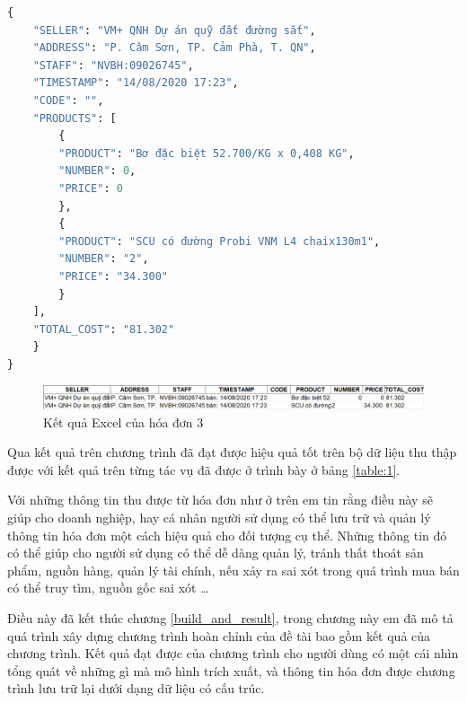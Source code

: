 \begin{lstlisting}[language=Python]
{
    "SELLER": "VM+ QNH Dự án quỹ đất đường sắt",
    "ADDRESS": "P. Câm Sơn, TP. Cảm Phà, T. QN",
    "STAFF": "NVBH:09026745",
    "TIMESTAMP": "14/08/2020 17:23",
    "CODE": "",
    "PRODUCTS": [
        {
        "PRODUCT": "Bơ đặc biệt 52.700/KG x 0,408 KG",
        "NUMBER": 0,
        "PRICE": 0
        },
        {
        "PRODUCT": "SCU có đường Probi VNM L4 chaix130m1",
        "NUMBER": "2",
        "PRICE": "34.300"
        }
    ],
    "TOTAL_COST": "81.302"
    }
}
\end{lstlisting}

\begin{figure}[h]
    \includegraphics[scale=0.314]{images/result-demo-excel-3.png}
    \caption{Kết quả Excel của hóa đơn 3}
\end{figure}
Qua kết quả trên chương trình đã đạt được hiệu quả tốt trên bộ dữ liệu thu thập được với kết quả trên từng tác vụ đã được ở trình bày ở bảng \ref{table:1}. 

Với những thông tin thu được từ hóa đơn như ở trên em tin rằng điều này sẽ giúp cho doanh nghiệp, hay cá nhân người sử dụng có thể lưu trữ và quản lý thông tin hóa đơn một cách hiệu quả cho đối tượng cụ thể. Những thông tin đó có thể giúp cho người sử dụng có thể dễ dàng quản lý, tránh thất thoát sản phẩm, nguồn hàng, quản lý tài chính, nếu xảy ra sai xót trong quá trình mua bán có thể truy tìm, nguồn gốc sai xót \dots

Điều này đã kết thúc chương \ref{build_and_result}, trong chương này em đã mô tả quá trình xây dựng chương trình hoàn chỉnh của đề tài bao gồm kết quả của chương trình. Kết quả đạt được của chương trình cho người dùng có một cái nhìn tổng quát về những gì mà mô hình trích xuất, và thông tin hóa đơn được chương trình lưu trữ lại dưới dạng dữ liệu có cấu trúc. 
